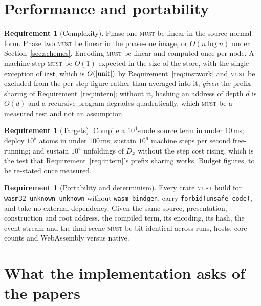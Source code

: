 \documentclass[11pt,a4paper]{article}
\newcommand{\code}[1]{\texttt{#1}}
\newcommand{\MUST}{\textsc{must}}
\newcommand{\inst}{\mathsf{inst}}
\theoremstyle{definition}
\newtheorem{requirement}[definition]{Requirement}
\theoremstyle{plain}
\begin{document}
\section{Performance and portability}\label{sec:perf}

\begin{requirement}[Complexity]\label{req:complexity}
Phase one \MUST{} be linear in the source normal form. Phase two \MUST{} be
linear in the phase-one image, or $O(n \log n)$ under
Section~\ref{sec:schemes}. Encoding \MUST{} be linear and computed once per
node. A machine step \MUST{} be $O(1)$ expected in the size of the store, with the
single exception of $\inst$, which is $O(|{\rm unit}|)$ by
Requirement~\ref{req:instwork} and \MUST{} be excluded from the per-step
figure rather than averaged into it,
\emph{given} the prefix sharing of Requirement~\ref{req:intern}; without it,
hashing an address of depth $d$ is $O(d)$ and a recursive program degrades
quadratically, which \MUST{} be a measured test and not an assumption.
\end{requirement}

\begin{requirement}[Targets]\label{req:targets}
Compile a $10^{4}$-node source term in under 10\,ms; deploy $10^{5}$ atoms in
under 100\,ms; sustain $10^{6}$ machine steps per second free-running; and
sustain $10^{4}$ unfoldings of $D_{x}$ without the step cost rising, which is
the test that Requirement~\ref{req:intern}'s prefix sharing works. Budget
figures, to be re-stated once measured.
\end{requirement}

\begin{requirement}[Portability and determinism]\label{req:port}
Every crate \MUST{} build for \code{wasm32-unknown-unknown} without
\code{wasm-bindgen}, carry \code{forbid(unsafe\_code)}, and take no external
dependency. Given the same source, presentation, construction and root
address, the compiled term, its encoding, its hash, the event stream and the
final scene \MUST{} be bit-identical across runs, hosts, core counts and
WebAssembly versus native.
\end{requirement}

\section{What the implementation asks of the papers}\label{sec:paper}
\end{document}
